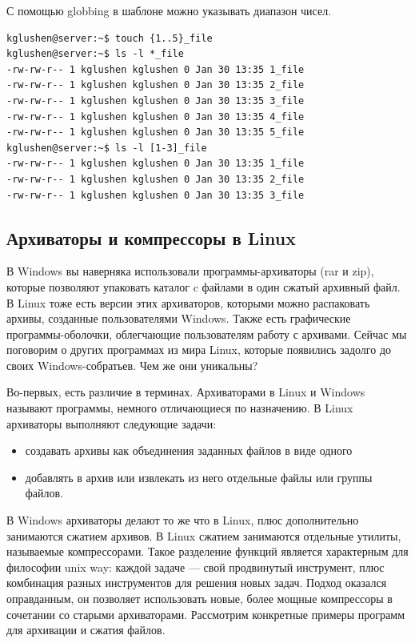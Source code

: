 \documentclass[14pt, a4paper]{article}
\begin{document}
С помощью globbing в шаблоне можно указывать диапазон чисел.

\begin{lstlisting}
kglushen@server:~$ touch {1..5}_file
kglushen@server:~$ ls -l *_file
-rw-rw-r-- 1 kglushen kglushen 0 Jan 30 13:35 1_file
-rw-rw-r-- 1 kglushen kglushen 0 Jan 30 13:35 2_file
-rw-rw-r-- 1 kglushen kglushen 0 Jan 30 13:35 3_file
-rw-rw-r-- 1 kglushen kglushen 0 Jan 30 13:35 4_file
-rw-rw-r-- 1 kglushen kglushen 0 Jan 30 13:35 5_file
kglushen@server:~$ ls -l [1-3]_file
-rw-rw-r-- 1 kglushen kglushen 0 Jan 30 13:35 1_file
-rw-rw-r-- 1 kglushen kglushen 0 Jan 30 13:35 2_file
-rw-rw-r-- 1 kglushen kglushen 0 Jan 30 13:35 3_file
\end{lstlisting}


\subsection*{Архиваторы и компрессоры в Linux}

В Windows вы наверняка использовали программы-архиваторы (rar и zip), которые позволяют
упаковать каталог c файлами в один сжатый архивный файл. В Linux тоже есть версии этих
архиваторов, которыми можно распаковать архивы, созданные пользователями Windows. Также есть
графические программы-оболочки, облегчающие пользователям работу с архивами. Сейчас мы
поговорим о других программах из мира Linux, которые появились задолго до своих
Windows-собратьев. Чем же они уникальны?

Во-первых, есть различие в терминах. Архиваторами в Linux и Windows называют программы,
немного отличающиеся по назначению. В Linux архиваторы выполняют следующие задачи:

\begin{itemize}
    \item создавать архивы как объединения заданных файлов в виде одного
    \item добавлять в архив или извлекать из него отдельные файлы или группы файлов.
\end{itemize}

В Windows архиваторы делают то же что в Linux, плюс дополнительно занимаются сжатием
архивов. В Linux сжатием занимаются отдельные утилиты, называемые компрессорами. Такое
разделение функций является характерным для философии unix way: каждой задаче — свой
продвинутый инструмент, плюс комбинация разных инструментов для решения новых задач. Подход
оказался оправданным, он позволяет использовать новые, более мощные компрессоры в сочетании
со старыми архиваторами. Рассмотрим конкретные примеры программ для архивации и сжатия
файлов.
\end{document}
